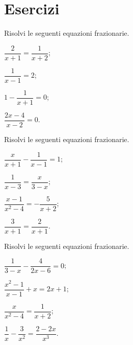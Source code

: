 
\section{Esercizi}



\begin{esercizio}[\Ast]
\label{ese:18.1}
Risolvi le seguenti equazioni frazionarie.
\begin{multicols}{2}
\begin{enumeratea}
 \item $\dfrac{2}{x+1}=\dfrac{1}{x+2}$;
 \item $\dfrac{1}{x-1}=2$;
 \item $1-\dfrac{1}{x+1}=0$;
 \item $\dfrac{2x-4}{x-2}=0$.
\end{enumeratea}
\end{multicols}
\end{esercizio}

\begin{esercizio}[\Ast]
\label{ese:18.2}
Risolvi le seguenti equazioni frazionarie.
\begin{multicols}{2}
\begin{enumeratea}
 \item $\dfrac{x}{x+1}-\dfrac{1}{x-1}=1$;
 \item $\dfrac{1}{x-3}=\dfrac{x}{3-x}$;
 \item $\dfrac{x-1}{x^{2}-4}=-{\dfrac{5}{x+2}}$;
 \item $\dfrac{3}{x+1}=\dfrac{2}{x+1}$.
\end{enumeratea}
\end{multicols}
\end{esercizio}
\begin{esercizio}[\Ast]
\label{ese:18.3}
Risolvi le seguenti equazioni frazionarie.
\begin{multicols}{2}
\begin{enumeratea}
 \item $\dfrac{1}{3-x}-\dfrac{4}{2x-6}=0$;
 \item $\dfrac{x^{2}-1}{x-1}+x=2x+1$;
 \item $\dfrac{x}{x^{2}-4}=\dfrac{1}{x+2}$;
 \item $\dfrac{1}{x}-\dfrac{3}{x^{2}}=\dfrac{2-2x}{x^{3}}$.
\end{enumeratea}
\end{multicols}
\end{esercizio}

